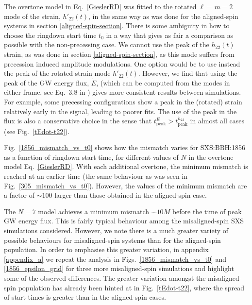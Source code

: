 The overtone model in Eq.~\ref{GieslerRD} was fitted to the rotated $\ell=m=2$ mode of the strain, $h'_{22}(t)$, in the same way as was done for the aligned-spin systems in section \ref{aligned-spin-section}.
There is some ambiguity in how to choose the ringdown start time $t_0$ in a way that gives as fair a comparison as possible with the non-precessing case.
We cannot use the peak of the $h_{22}(t)$ strain, as was done in section \ref{aligned-spin-section}, as this mode suffers from precession induced amplitude modulations. 
One option would be to use instead the peak of the rotated strain mode $h'_{22}(t)$.
However, we find that using the peak of the GW energy flux, $\dot{E}$, (which can be computed from the modes in either frame, see Eq.~3.8 in \cite{2008GReGr..40.1705R}) gives more consistent results between simulations. For example, some precessing configurations show a peak in the (rotated) strain relatively early in the signal, leading to poorer fits.
The use of the peak in the flux is also a conservative choice in the sense that $t_{\mathrm{peak}}^{\dot{E}} > t_{\mathrm{peak}}^{h_{22}}$ in almost all cases (see Fig.~\ref{tEdot-t22}).

Fig.~\ref{1856_mismatch_vs_t0} shows how the mismatch varies for SXS:BBH:1856 as a function of ringdown start time, for different values of $N$ in the overtone model Eq.~\ref{GieslerRD}.
With each additional overtone, the minimum mismatch is reached at an earlier time (the same behaviour as was seen in Fig.~\ref{305_mismatch_vs_t0}).
However, the values of the minimum mismatch are a factor of $\sim 100$ larger than those obtained in the aligned-spin case. 

The $N=7$ model achieves a minimum mismatch $\sim 10M$ before the time of peak GW energy flux. This is fairly typical behaviour among the misaligned-spin SXS simulations considered.
However, we note there is a much greater variety of possible behaviours for misaligned-spin systems than for the aligned-spin population. 
In order to emphasise this greater variation, in appendix \ref{appendix_a} we repeat the analysis in Figs.~\ref{1856_mismatch_vs_t0} and \ref{1856_epsilon_grid} for three more misaligned-spin simulations and highlight some of the observed differences. 
The greater variation amongst the misaligned-spin population has already been hinted at in Fig.~\ref{tEdot-t22}, where the spread of start times is greater than in the aligned-spin cases.

